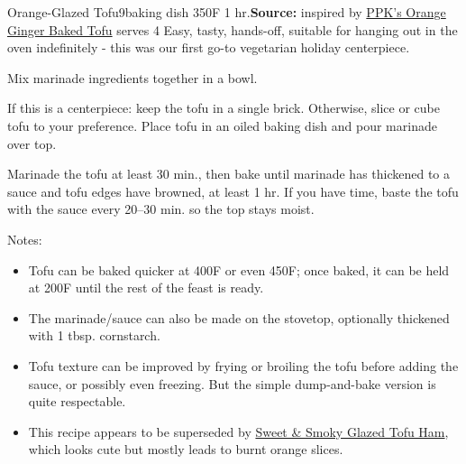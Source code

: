 \begin{recipe}{Orange-Glazed Tofu}{9\inch{}\inch baking dish \hfill 350\0F \hfill 1 hr.}{\textbf{Source:} inspired by \href{https://web.archive.org/web/20101121022851/https://www.theppk.com/2010/04/orange-ginger-baked-tofu/}{PPK's Orange Ginger Baked Tofu} \hfill serves 4}
 \freeform Easy, tasty, hands-off, suitable for hanging out in the oven indefinitely - this was our first go-to vegetarian holiday centerpiece.

 Mix marinade ingredients together in a bowl.

 If this is a centerpiece: keep the tofu in a single brick. Otherwise, slice or cube tofu to your preference. Place tofu in an oiled baking dish and pour marinade over top.

 \newstep Marinade the tofu at least 30 min., then bake until marinade has thickened to a sauce and tofu edges have browned, at least 1 hr. If you have time, baste the tofu with the sauce every 20--30 min. so the top stays moist.

 \freeform Notes:
 \begin{itemize}
  \item Tofu can be baked quicker at 400\0F or even 450\0F; once baked, it can be held at 200\0F until the rest of the feast is ready.
  \item The marinade/sauce can also be made on the stovetop, optionally thickened with 1 tbsp. cornstarch.
  \item Tofu texture can be improved by frying or broiling the tofu before adding the sauce, or possibly even freezing. But the simple dump-and-bake version is quite respectable.
  \item This recipe appears to be superseded by \href{https://www.theppk.com/2016/12/sweet-smoky-glazed-tofu-ham/}{Sweet \& Smoky Glazed Tofu Ham}, which looks cute but mostly leads to burnt orange slices.
 \end{itemize}
\end{recipe}
